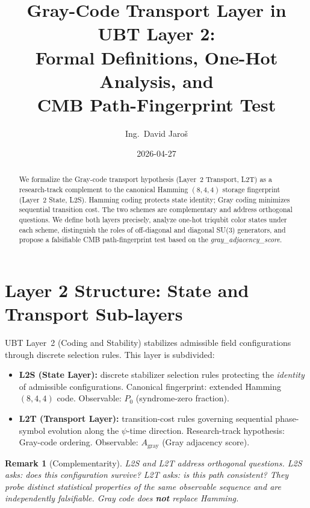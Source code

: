 \documentclass[11pt]{article}
\title{Gray-Code Transport Layer in UBT Layer 2:\\
Formal Definitions, One-Hot Analysis, and\\
CMB Path-Fingerprint Test}
\author{Ing.\ David Jaro\v{s}}
\date{2026-04-27}
\newtheorem{remark}{Remark}
\begin{document}
\maketitle

\begin{abstract}
We formalize the Gray-code transport hypothesis (Layer~2 Transport, L2T) as a
research-track complement to the canonical Hamming $(8,4,4)$ storage fingerprint
(Layer~2 State, L2S). Hamming coding protects state identity; Gray coding
minimizes sequential transition cost. The two schemes are complementary and
address orthogonal questions. We define both layers precisely, analyze
one-hot triqubit color states under each scheme, distinguish the roles of
off-diagonal and diagonal SU(3) generators, and propose a falsifiable
CMB path-fingerprint test based on the \emph{gray\_adjacency\_score}.
\end{abstract}

\tableofcontents
\newpage

\section{Layer 2 Structure: State and Transport Sub-layers}

UBT Layer~2 (Coding and Stability) stabilizes admissible field configurations
through discrete selection rules. This layer is subdivided:

\begin{itemize}
\item \textbf{L2S (State Layer):} discrete stabilizer selection rules protecting
the \emph{identity} of admissible configurations.
Canonical fingerprint: extended Hamming $(8,4,4)$ code.
Observable: $P_0$ (syndrome-zero fraction).

\item \textbf{L2T (Transport Layer):} transition-cost rules governing sequential
phase-symbol evolution along the $\psi$-time direction.
Research-track hypothesis: Gray-code ordering.
Observable: $A_{\mathrm{gray}}$ (Gray adjacency score).
\end{itemize}

\begin{remark}[Complementarity]
L2S and L2T address orthogonal questions.
L2S asks: \emph{does this configuration survive?}
L2T asks: \emph{is this path consistent?}
They probe distinct statistical properties of the same observable sequence
and are independently falsifiable.
Gray code does \textbf{not} replace Hamming.
\end{remark}
\end{document}
